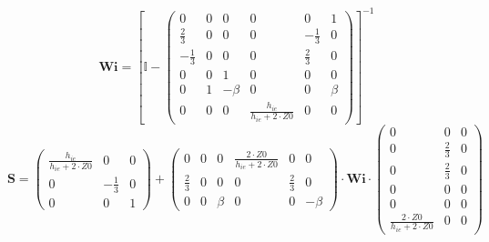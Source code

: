 \[ \mathbf{Wi} =  \left[ \mathbb{I}  - \left(\begin{smallmatrix} 0 & 0 & 0 & 0 & 0 & 1 \\ \frac{2}{3} & 0 & 0 & 0 & -\frac{1}{3} & 0 \\ -\frac{1}{3} & 0 & 0 & 0 & \frac{2}{3} & 0 \\ 0 & 0 & 1 & 0 & 0 & 0 \\ 0 & 1 & -\beta & 0 & 0 & \beta \\ 0 & 0 & 0 & \frac{h_{ie}}{h_{ie}+2\cdot Z0} & 0 & 0 \end{smallmatrix}\right) \right]^{-1}  \]
\[ \mathbf{S} = \left(\begin{smallmatrix} \frac{h_{ie}}{h_{ie}+2\cdot Z0} & 0 & 0 \\ 0 & -\frac{1}{3} & 0 \\ 0 & 0 & 1 \end{smallmatrix}\right) + \left(\begin{smallmatrix} 0 & 0 & 0 & \frac{2\cdot Z0}{h_{ie}+2\cdot Z0} & 0 & 0 \\ \frac{2}{3} & 0 & 0 & 0 & \frac{2}{3} & 0 \\ 0 & 0 & \beta & 0 & 0 & -\beta \end{smallmatrix}\right) \cdot \mathbf{Wi} \cdot\left(\begin{smallmatrix} 0 & 0 & 0 \\ 0 & \frac{2}{3} & 0 \\ 0 & \frac{2}{3} & 0 \\ 0 & 0 & 0 \\ 0 & 0 & 0 \\ \frac{2\cdot Z0}{h_{ie}+2\cdot Z0} & 0 & 0 \end{smallmatrix}\right) \]
